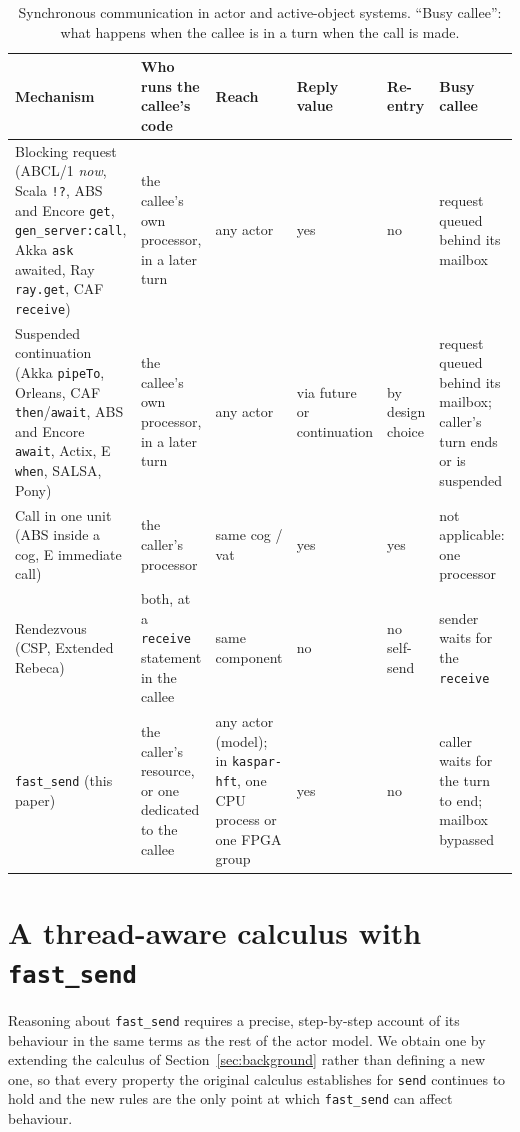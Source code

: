 \documentclass[11pt]{article}
\newcommand{\rowsep}{\specialrule{0.3pt}{1.5pt}{1.5pt}}
\theoremstyle{definition}
\theoremstyle{remark}
\newcommand{\fs}{\texttt{fast\_send}}
\newcommand{\snd}{\texttt{send}}
\newcommand{\kh}{\texttt{kaspar-hft}}
\begin{document}
\begin{table}[t]
\centering
\caption{Synchronous communication in actor and active-object systems. ``Busy callee'':
what happens when the callee is in a turn when the call is made.}
\label{tab:sync}
\small
\begin{tabular}{@{}P{3.0cm}P{3.0cm}P{1.8cm}P{1.1cm}P{1.4cm}P{3.3cm}@{}}
\toprule
Mechanism & Who runs the callee's code & Reach & Reply value & Re-entry & Busy callee \\
\midrule
Blocking request (ABCL/1 \emph{now}, Scala \texttt{!?}, ABS and Encore \texttt{get}, \texttt{gen\_server:call}, Akka \texttt{ask} awaited, Ray \texttt{ray.get}, CAF \texttt{receive}) & the callee's own processor, in a later turn & any actor & yes & no & request queued behind its mailbox \\ \rowsep
Suspended continuation (Akka \texttt{pipeTo}, Orleans, CAF \texttt{then}/\texttt{await}, ABS and Encore \texttt{await}, Actix, E \texttt{when}, SALSA, Pony) & the callee's own processor, in a later turn & any actor & via future or continuation & by design choice & request queued behind its mailbox; caller's turn ends or is suspended \\ \rowsep
Call in one unit (ABS inside a cog, E immediate call) & the caller's processor & same cog / vat & yes & yes & not applicable: one processor \\ \rowsep
Rendezvous (CSP, Extended Rebeca) & both, at a \texttt{receive} statement in the callee & same component & no & no self-send & sender waits for the \texttt{receive} \\ \rowsep
\fs{} (this paper) & the caller's resource, or one dedicated to the callee & any actor (model); in \kh{}, one CPU process or one FPGA group & yes & no & caller waits for the turn to end; mailbox bypassed \\
\bottomrule
\end{tabular}
\end{table}

\section{A thread-aware calculus with \fs{}}
\label{sec:calculus}

Reasoning about \fs{} requires a precise, step-by-step account of its behaviour in the
same terms as the rest of the actor model. We obtain one by extending the calculus of
Section~\ref{sec:background} rather than defining a new one, so that every property the
original calculus establishes for \snd{} continues to hold and the new rules are the only
point at which \fs{} can affect behaviour.
\end{document}
